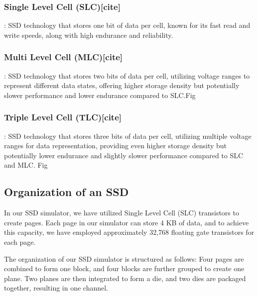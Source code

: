 \documentclass[conference]{IEEEtran}
\begin{document}
\subsubsection{Single Level Cell (SLC)[cite]}: SSD technology that stores one bit of data per cell, known for its fast read and write speeds, along with high endurance and reliability.
\subsubsection{Multi Level Cell (MLC)[cite]}: SSD technology that stores two bits of data per cell, utilizing voltage ranges to represent different data states, offering higher storage density but potentially slower performance and lower endurance compared to SLC.Fig
\subsubsection{Triple Level Cell (TLC)[cite]}: SSD technology that stores three bits of data per cell, utilizing multiple voltage ranges for data representation, providing even higher storage density but potentially lower endurance and slightly slower performance compared to SLC and MLC. Fig

\subsection{Organization of an SSD}
In our SSD simulator, we have utilized Single Level Cell (SLC) transistors to create pages. Each page in our simulator can store 4 KB of data, and to achieve this capacity, we have employed approximately 32,768 floating gate transistors for each page.

The organization of our SSD simulator is structured as follows: Four pages are combined to form one block, and four blocks are further grouped to create one plane. Two planes are then integrated to form a die, and two dies are packaged together, resulting in one channel.
\end{document}
